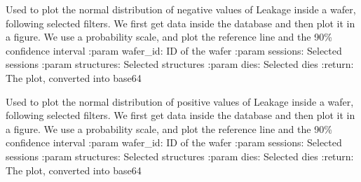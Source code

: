 \documentclass[letterpaper,10pt,english]{sphinxmanual}
\begin{document}
\begin{fulllineitems}
\label{\detokenize{normal_plots:normal_plots.Leakage_normal_distrib_neg}}
\pysigstartsignatures
{}
\pysigstopsignatures
\sphinxAtStartPar
Used to plot the normal distribution of negative values of Leakage inside a wafer, following selected filters.
We first get data inside the database and then plot it in a figure. We use a probability scale, and plot the reference line and the 90\% confidence interval
:param wafer\_id: ID of the wafer
:param sessions: Selected sessions
:param structures: Selected structures
:param dies: Selected dies
:return: The plot, converted into base64

\end{fulllineitems}


\begin{fulllineitems}
\label{\detokenize{normal_plots:normal_plots.Leakage_normal_distrib_pos}}
\pysigstartsignatures
{}
\pysigstopsignatures
\sphinxAtStartPar
Used to plot the normal distribution of positive values of Leakage inside a wafer, following selected filters.
We first get data inside the database and then plot it in a figure. We use a probability scale, and plot the reference line and the 90\% confidence interval
:param wafer\_id: ID of the wafer
:param sessions: Selected sessions
:param structures: Selected structures
:param dies: Selected dies
:return: The plot, converted into base64

\end{fulllineitems}

\end{document}
